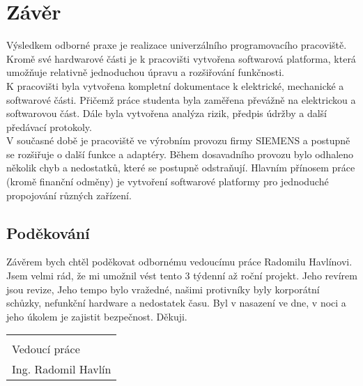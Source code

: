 \chapter*{Závěr}
{}

Výsledkem odborné praxe je realizace univerzálního programovacího pracoviště.
Kromě své hardwarové části je k pracovišti vytvořena softwarová platforma, která
umožňuje relativně jednoduchou úpravu a rozšiřování funkčnosti.\\

K pracovišti byla vytvořena kompletní dokumentace k elektrické, mechanické a softwarové části.
Přičemž práce studenta byla zaměřena převážně na elektrickou a softwarovou část.
Dále byla vytvořena analýza rizik, předpis údržby a další předávací protokoly.\\

V současné době je pracoviště ve výrobním provozu firmy SIEMENS a postupně se 
rozšiřuje o další funkce a adaptéry.
Během dosavadního provozu bylo odhaleno několik chyb a nedostatků, které se postupně odstraňují.
Hlavním přínosem práce (kromě finanční odměny) je vytvoření softwarové platformy pro jednoduché propojování
různých zařízení.\\

\section*{Poděkování}
Závěrem bych chtěl poděkovat odbornému vedoucímu práce Radomilu Havlínovi. Jsem velmi rád,
že mi umožnil vést tento 3 týdenní až roční projekt.
Jeho revírem jsou revize,
Jeho tempo bylo vražedné, našimi 
protivníky byly korporátní schůzky, nefunkční hardware a nedostatek času.
Byl v nasazení ve dne, v noci a jeho úkolem je zajistit bezpečnost. Děkuji.

\vfill
\begin{flushright}
\begin{tabular}{@{}p{2.5in}@{}}
\hrulefill \\
Vedoucí práce \\
Ing. Radomil Havlín
\end{tabular}
\end{flushright}

